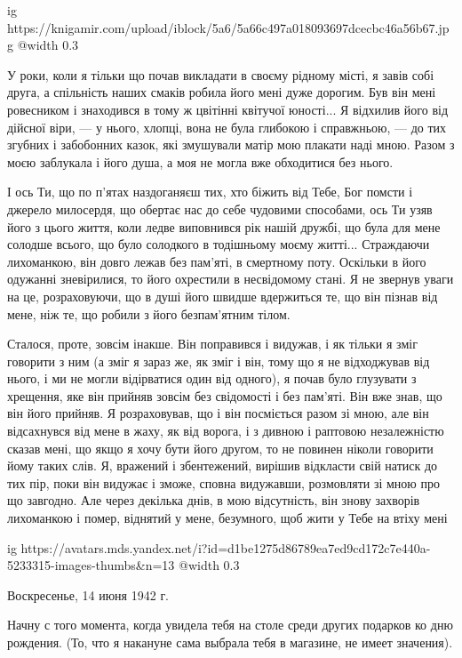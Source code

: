 \begin{multicols}{2}
\em\color{magenta}

\ifcmt
  ig https://knigamir.com/upload/iblock/5a6/5a66c497a018093697dcecbc46a56b67.jpg
  @width 0.3
\fi

У роки, коли я тільки що почав викладати в своєму рідному місті, я завів собі
друга, а спільність наших смаків робила його мені дуже дорогим. Був він мені
ровесником і знаходився в тому ж цвітінні квітучої юності... Я відхилив його
від дійсної віри, — у нього, хлопці, вона не була глибокою і справжньою, — до
тих згубних і забобонних казок, які змушували матір мою плакати наді мною.
Разом з моєю заблукала і його душа, а моя не могла вже обходитися без нього.

І ось Ти, що по п'ятах наздоганяєш тих, хто біжить від Тебе, Бог помсти і
джерело милосердя, що обертає нас до себе чудовими способами, ось Ти узяв його
з цього життя, коли ледве виповнився рік нашій дружбі, що була для мене солодше
всього, що було солодкого в тодішньому моєму житті... Страждаючи лихоманкою,
він довго лежав без пам'яті, в смертному поту. Оскільки в його одужанні
зневірилися, то його охрестили в несвідомому стані. Я не звернув уваги на це,
розраховуючи, що в душі його швидше вдержиться те, що він пізнав від мене, ніж
те, що робили з його безпам'ятним тілом.

Сталося, проте, зовсім інакше. Він поправився і видужав, і як тільки я зміг
говорити з ним (а зміг я зараз же, як зміг і він, тому що я не відходжував від
нього, і ми не могли відірватися один від одного), я почав було глузувати з
хрещення, яке він прийняв зовсім без свідомості і без пам'яті. Він вже знав, що
він його прийняв. Я розраховував, що і він посміється разом зі мною, але він
відсахнувся від мене в жаху, як від ворога, і з дивною і раптовою незалежністю
сказав мені, що якщо я хочу бути його другом, то не повинен ніколи говорити
йому таких слів. Я, вражений і збентежений, вирішив відкласти свій натиск до
тих пір, поки він видужає і зможе, сповна видужавши, розмовляти зі мною про що
завгодно. Але через декілька днів, в мою відсутність, він знову захворів
лихоманкою і помер, віднятий у мене, безумного, щоб жити у Тебе на втіху мені

\ifcmt
  ig https://avatars.mds.yandex.net/i?id=d1be1275d86789ea7ed9cd172c7e440a-5233315-images-thumbs&n=13
  @width 0.3
\fi

Воскресенье, 14 июня 1942 г.

Начну с того момента, когда увидела тебя на столе среди других подарков ко
дню рождения. (То, что я накануне сама выбрала тебя  в магазине, не имеет
значения).


\end{multicols}
